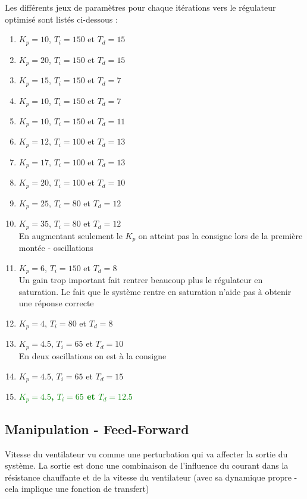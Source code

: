 Les différents jeux de paramètres pour chaque itérations vers le régulateur optimisé sont listés ci-dessous : 
\begin{enumerate}
\item $K_{p} = 10$, $T_{i} = 150$ et $T_{d} = 15$
\item $K_{p} = 20$, $T_{i} = 150$ et $T_{d} = 15$
\item $K_{p} = 15$, $T_{i} = 150$ et $T_{d} = 7$
\item $K_{p} = 10$, $T_{i} = 150$ et $T_{d} = 7$
\item $K_{p} = 10$, $T_{i} = 150$ et $T_{d} = 11$
\item $K_{p} = 12$, $T_{i} = 100$ et $T_{d} = 13$
\item $K_{p} = 17$, $T_{i} = 100$ et $T_{d} = 13$
\item $K_{p} = 20$, $T_{i} = 100$ et $T_{d} = 10$
\item $K_{p} = 25$, $T_{i} = 80$ et $T_{d} = 12$
\item $K_{p} = 35$, $T_{i} = 80$ et $T_{d} = 12$\\
En augmentant seulement le $K_{p}$ on atteint pas la consigne lors de la première montée - oscillations 

\item $K_{p} = 6$, $T_{i} = 150$ et $T_{d} = 8$\\
Un gain trop important fait rentrer beaucoup plus le régulateur en saturation. Le fait que le système rentre en saturation n'aide pas à obtenir une réponse correcte

\item $K_{p} = 4$, $T_{i} = 80$ et $T_{d} = 8$

\item $K_{p} = 4.5$, $T_{i} = 65$ et $T_{d} = 10$\\
En deux oscillations on est à la consigne 

\item $K_{p} = 4.5$, $T_{i} = 65$ et $T_{d} = 15$
\item \textbf{\textcolor{green}{$K_{p} = 4.5$, $T_{i} = 65$ et $T_{d} = 12.5$}}
\end{enumerate}

\subsection{Manipulation - Feed-Forward}
Vitesse du ventilateur vu comme une perturbation  qui va affecter la sortie du système. La sortie est donc une combinaison de l'influence du courant dans la résistance chauffante et de la vitesse du ventilateur (avec sa dynamique propre - cela implique une fonction de transfert)\\

